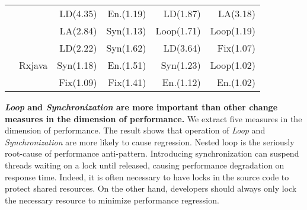 \begin{table}[]
\begin{tabular}{|c|c|r|r|r|r|}
	&                         & LD(4.35)                     & En.(1.19)                & LD(1.87)                    & LA(3.18)                \\ \cline{3-6} 
	&                         & LA(2.84)                     & Syn(1.13)                & Loop(1.71)                  & Loop(1.19)              \\ \cline{2-6} 
	& \multirow{3}{*}{Rxjava} & LD(2.22)                     & Syn(1.62)                & LD(3.64)                    & Fix(1.07)               \\ \cline{3-6} 
	&                         & Syn(1.18)                    & En.(1.51)                & Syn(1.23)                   & Loop(1.02)              \\ \cline{3-6} 
	&                         & Fix(1.09)                    & Fix(1.41)                & En.(1.12)                   & En.(1.02)               \\ \hline
\end{tabular}
\end{table}

\textbf{\emph{Loop} and \emph{Synchronization} are more important than other change measures in the dimension of performance.}
We extract five measures in the dimension of performance. The result shows that operation of \emph{Loop} and \emph{Synchronization} are more likely to cause regression. Nested loop is the seriously root-cause of performance anti-pattern. Introducing synchronization can suspend threads waiting on a lock until released, causing performance degradation on response time. Indeed, it is often necessary to have locks in the source code to protect shared resources. On the other hand, developers should always only lock the necessary resource to minimize performance regression. 





